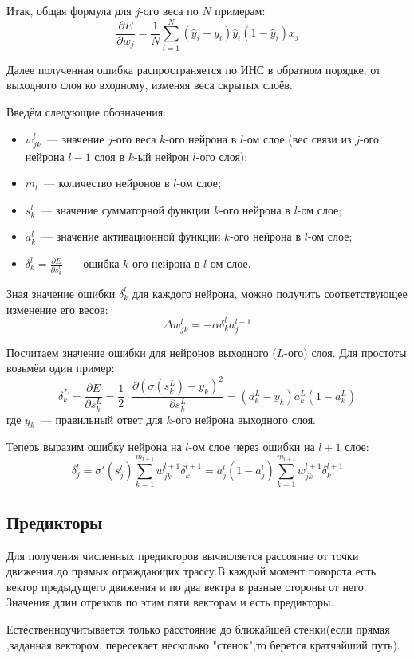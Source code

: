 	Итак, общая формула для $j$-ого веса по $N$ примерам:
	\[
		\frac{\partial E}{\partial w_j} = \frac{1}{N}\sum_{i = 1}^N
		\left(\hat y_i - y_i\right)\hat y_i\left(1 - \hat y_i\right) x_j
	\]

	Далее полученная ошибка распространяется по ИНС в обратном порядке, от выходного слоя ко входному, изменяя веса скрытых слоёв.
	
	Введём следующие обозначения:
	\begin{itemize}
		\item $w_{jk}^l$~--- значение $j$-ого веса $k$-ого нейрона в $l$-ом слое (вес связи из $j$-ого нейрона $l - 1$ слоя в $k$-ый нейрон $l$-ого слоя);
		\item $m_l$~--- количество нейронов в $l$-ом слое;
		\item $s_k^l$~--- значение сумматорной функции $k$-ого нейрона в $l$-ом слое;
		\item $a_k^l$~--- значение активационной функции $k$-ого нейрона в $l$-ом слое;
		\item $\delta_k^l = \frac{\partial E}{\partial s_k^l}$~--- ошибка $k$-ого нейрона в $l$-ом слое.
	\end{itemize}

	Зная значение ошибки $\delta_k^l$ для каждого нейрона, можно получить соответствующее изменение его весов:
	\[
		\Delta w_{jk}^l = -\alpha\delta_k^l a_j^{l-1}
	\]

	Посчитаем значение ошибки для нейронов выходного ($L$-ого) слоя. Для простоты возьмём один пример:
	\[
		\delta_k^L = \frac{\partial E}{\partial s_k^L} =
		\frac{1}{2}\cdot\frac{\partial\left(\sigma\left(s_k^L\right) - y_k\right)^2}{\partial s_k^L} = 
		\left(a_k^L - y_k\right)a_k^L\left(1 - a_k^L\right)
	\]
	где $y_k$~--- правильный ответ для $k$-ого нейрона выходного слоя.

	Теперь выразим ошибку нейрона на $l$-ом слое через ошибки на $l + 1$ слое:
	\[
		\delta_j^l = \sigma\prime\left(s_j^l\right)\sum_{k = 1}^{m_{l + 1}} w_{jk}^{l + 1} \delta_k^{l+1} = 
		a_j^l\left(1 - a_j^l\right)\sum_{k = 1}^{m_{l + 1}} w_{jk}^{l + 1} \delta_k^{l+1}
	\]

\subsection{Предикторы}
	Для получения численных предикторов вычисляется рассояние от точки движения до прямых ограждающих трассу.В каждый момент поворота есть вектор предыдущего движения и по два вектра в разные стороны от него. Значения длин отрезков по этим пяти векторам и есть предикторы.
	
	Естественноучитывается только расстояние до ближайшей стенки(если прямая ,заданная вектором, пересекает несколько "стенок",то берется кратчайший путь).